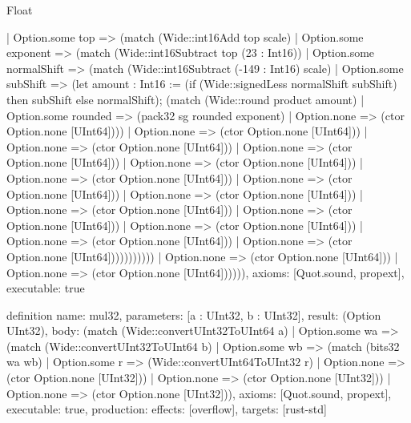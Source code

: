 \begin{lexlean}{Float}
\begin{semanticmodule}
{                        | Option.some top => (match (Wide::int16Add top scale)
                          | Option.some exponent => (match (Wide::int16Subtract top (23 : Int16))
                            | Option.some normalShift => (match (Wide::int16Subtract (-149 : Int16) scale)
                              | Option.some subShift => (let amount : Int16 := (if (Wide::signedLess normalShift subShift) then subShift else normalShift); (match (Wide::round product amount)
                                | Option.some rounded => (pack32 sg rounded exponent)
                                | Option.none => (ctor Option.none [UInt64])))
                              | Option.none => (ctor Option.none [UInt64]))
                            | Option.none => (ctor Option.none [UInt64]))
                          | Option.none => (ctor Option.none [UInt64]))
                        | Option.none => (ctor Option.none [UInt64]))
                      | Option.none => (ctor Option.none [UInt64]))
                    | Option.none => (ctor Option.none [UInt64]))
                  | Option.none => (ctor Option.none [UInt64]))
                | Option.none => (ctor Option.none [UInt64]))
              | Option.none => (ctor Option.none [UInt64]))
            | Option.none => (ctor Option.none [UInt64]))
          | Option.none => (ctor Option.none [UInt64]))
        | Option.none => (ctor Option.none [UInt64]))))))))))
      | Option.none => (ctor Option.none [UInt64]))
    | Option.none => (ctor Option.none [UInt64]))))),
  axioms: [Quot.sound, propext],
  executable: true
}

definition{
  name: mul32,
  parameters: [a : UInt32, b : UInt32],
  result: (Option UInt32),
  body: (match (Wide::convertUInt32ToUInt64 a)
    | Option.some wa => (match (Wide::convertUInt32ToUInt64 b)
      | Option.some wb => (match (bits32 wa wb)
        | Option.some r => (Wide::convertUInt64ToUInt32 r)
        | Option.none => (ctor Option.none [UInt32]))
      | Option.none => (ctor Option.none [UInt32]))
    | Option.none => (ctor Option.none [UInt32])),
  axioms: [Quot.sound, propext],
  executable: true,
  production: {effects: [overflow], targets: [rust-std]}
}


\end{semanticmodule}
\end{lexlean}
